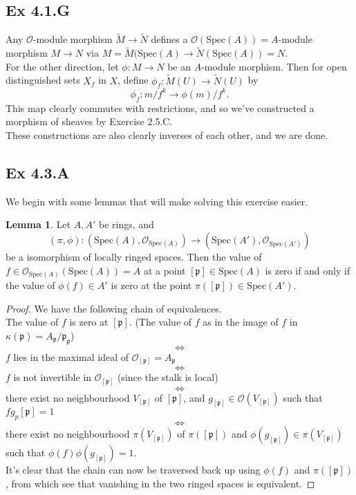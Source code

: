 \documentclass{article}
\theoremstyle{definition}
\newtheorem{lemma}[theorem]{Lemma}
\newcommand{\oo}{\mathcal{O}}
\newcommand{\osp}[1]{\oo_{\Spec\left(#1\right)}}
\newcommand{\Spec}{\text{Spec}}
\begin{document}
\subsection*{Ex 4.1.G}

Any $\mathcal{O}$-module morphism $\widetilde{M} \to \widetilde{N}$ defines a
$\mathcal{O}(\Spec(A)) = A$-module morphism $M \to N$ via $M =
\widetilde{M}(\Spec(A) \to \widetilde{N}(\Spec(A)) = N$. \\

For the other direction, let $\phi : M \to N$ be an $A$-module morphism. Then
for open distinguished sets $X_f$ in $X$, define $\phi_f : \widetilde{M}(U) \to
\widetilde{N}(U)$ by
\[
	\phi_f 
	:
	m/f^k
	\to
	\phi(m)/f^k.
\]
This map clearly commutes with restrictions, and so we've constructed a
morphism of sheaves by Exercise 2.5.C. \\

These constructions are also clearly inverses of each other, and we are done.

\subsection*{Ex 4.3.A}

We begin with some lemmas that will make solving this exercise easier.
\begin{lemma}
	Let $A, A'$ be rings, and 
	\[
		(\pi, \phi) 
		: 
		(\Spec(A), \osp{A})
		\to
		(\Spec(A'), \osp{A'})
	\] 
	be a isomorphism of locally ringed spaces. Then the value of $f \in
	\osp{A}(\Spec(A)) = A$ at a point $[\mathfrak{p}] \in \Spec(A)$ is zero if
	and only if the value of $\phi(f) \in A'$ is zero at the point
	$\pi([\mathfrak{p}]) \in \Spec(A')$.
\end{lemma}
\begin{proof}
	We have the following chain of equivalences. \\

	The value of $f$ is zero at $[\mathfrak{p}]$. (The value of $f$ as in the
	image of $f$ in $\kappa(\mathfrak{p}) =
	A_{\mathfrak{p}}/\mathfrak{p}_{\mathfrak{p}}$)
	\[
		\Leftrightarrow
	\] 
	$f$ lies in the maximal ideal of $\oo_{[\mathfrak{p}]} = A_{\mathfrak{p}}$ 
	\[
		\Leftrightarrow
	\] 
	$f$ is not invertible in $\oo_{[\mathfrak{p}]}$ (since the stalk is local)
	\[
		\Leftrightarrow
	\] 
	there exist no neighbourhood $V_{[\mathfrak{p}]}$ of $[\mathfrak{p}]$, and
	$g_{[\mathfrak{p}]} \in \oo(V_{[\mathfrak{p}]})$ such that
	$fg_p{[\mathfrak{p}]} = 1$
	\[
		\Leftrightarrow
	\] 
	there exist no neighbourhood $\pi(V_{[\mathfrak{p}]})$ of
	$\pi({[\mathfrak{p}]})$ and $\phi(g_{[\mathfrak{p}]}) \in
	\pi(V_{[\mathfrak{p}]})$ such that $\phi(f)\phi(g_{[\mathfrak{p}]}) = 1$.
	\\

	It's clear that the chain can now be traversed back up using $\phi(f)$ and
	$\pi([\mathfrak{p}])$, from which see that vanishing in the two ringed
	spaces is equivalent.
\end{proof}
\end{document}
